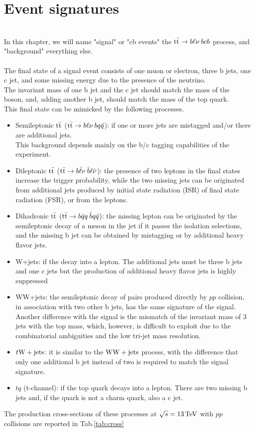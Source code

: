 \section{Event signatures}
\\
In this chapter, we will name "signal" or "cb events" the ${{\text{t}}{\bar{\text{t}}}} \to b\ell\nu\: bcb$ process, and "background" everything else.\\
\\
The final state of a signal event consists of one muon or electron, three b jets, one c jet, and some missing energy due to the presence of the neutrino.\\
The invariant mass of one b jet and the c jet should match the mass of the \PW boson, and, adding another b jet, should match the mass of the top quark.\\
This final state can be mimicked by the following processes.
\begin{itemize}
    \item Semileptonic ${{\text{t}}{\bar{\text{t}}}}$ (${{\text{t}}{\bar{\text{t}}}}\to b\ell\nu \: bq\bar{q}$): if one or more jets are mistagged and/or there are additional jets.\\
    This background depends mainly on the b/c tagging capabilities of the experiment.
    \item Dileptonic ${{\text{t}}{\bar{\text{t}}}}$ (${{\text{t}}{\bar{\text{t}}}} \to b\bar{\ell}\nu \: \bar{b}\ell\bar{\nu}$): the presence of two leptons in the final states increase the trigger probability, while the two missing jets can be originated from additional jets produced by initial state radiation (ISR) of final state radiation (FSR), or from the leptons.
    \item Dihadronic ${{\text{t}}{\bar{\text{t}}}}$ (${{\text{t}}{\bar{\text{t}}}} \to b\bar{q}q \: \bar{b}q\bar{q}$): the missing lepton can be originated by the semileptonic decay of a meson in the jet if it passes the isolation selections, and the missing b jet can be obtained by mistagging or by additional heavy flavor jets.
    \item W+jets: if the \PW decay into a lepton. The additional jets must be three b jets and one c jets but the production of additional heavy flavor jets is highly suppressed 
    \item WW+jets: the semileptonic decay of \PW pairs produced directly by $pp$ collision, in association with two other b jets, has the same signature of the signal. Another difference with the signal is the mismatch of the invariant mass of 3 jets with the top mass, which, however, is difficult to exploit due to the combinatorial ambiguities and the low tri-jet mass resolution.  
    \item $t{\text{W}}+\text{jets}$: it is similar to the ${\text{W}} {\text{W}} + \text{jets}$ process, with the difference that only one additional b jet instead of two is required to match the signal signature.
    \item $tq$ (t-channel): if the top quark decays into a lepton. There are two missing b jets and, if the quark is not a charm quark, also a c jet.
\end{itemize}
The production cross-sections of these processes  at $\sqrt{s}=13{\,\text{Te\hspace{-.08em}V}}$ with $pp$ collisions are reported in Tab.\ref{tab:cross}

